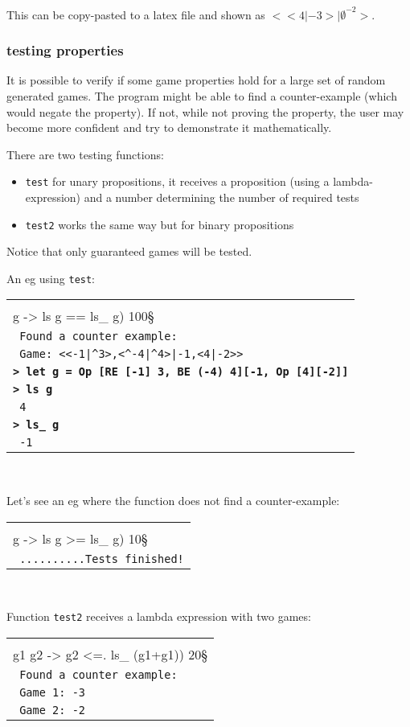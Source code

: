 \documentclass[a4paper,12pt]{article}
\newcommand{\bash}[1]{\small\textbf{\lstinline§> #1§}\\}
\newcommand{\out}[1]{\small\lstinline§ #1§}
\newcommand{\haskellCode}{\fontfamily{pcr}\selectfont}
\newenvironment{sgcode}
	{ \haskellCode
	  \begin{tabular}{|p{0.9\textwidth}|}
      \hline	
	}
	{ \\\hline  
      \end{tabular} \\
	  \par 
	}
\begin{document}
This can be copy-pasted to a latex file and shown as $<<4|-3>|\emptyset^{-2}>$.

\subsubsection{testing properties}

It is possible to verify if some game properties hold for a large set of
random generated games. The program might be able to find a counter-example
(which would negate the property). If not, while not proving the property,
the user may become more confident and try to demonstrate it mathematically.

There are two testing functions:

\begin{itemize} \setlength\itemsep{0.1em}
  \item \verb|test| for unary propositions, it receives a proposition (using a lambda-expression) 
  and a number determining the number of required tests
  \item \verb|test2| works the same way but for binary propositions
\end{itemize}

Notice that only guaranteed games will be tested.

An eg using \verb!test!:

\begin{sgcode}
\bash{test (\\g -> ls g == ls_ g) 100}
\out{Found a counter example:} \\
\out{Game: <<-1|^3>,<^-4|^4>|-1,<4|-2>>} \\
\bash{let g = Op [RE [-1] 3, BE (-4) 4][-1, Op [4][-2]]}
\bash{ls g}
\out{4} \\
\bash{ls_ g}
\out{-1}
\end{sgcode}

Let's see an eg where the function does not find a counter-example:

\begin{sgcode}
\bash{test (\\g -> ls g >= ls_ g) 10}
\out{..........Tests finished!}
\end{sgcode}

Function \verb|test2| receives a lambda expression with two games:

\begin{sgcode}
\bash{test2 (\\g1 g2 -> g2 <=. ls_ (g1+g1)) 20}
\out{Found a counter example:} \\
\out{Game 1: -3} \\
\out{Game 2: -2} 
\end{sgcode}
\end{document}
